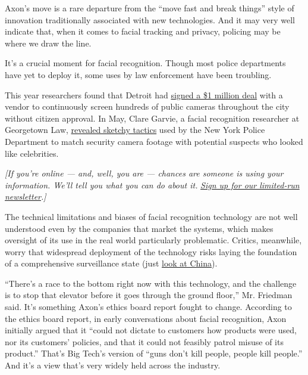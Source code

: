 Axon's move is a rare departure from the ``move fast and break things''
style of innovation traditionally associated with new technologies. And
it may very well indicate that, when it comes to facial tracking and
privacy, policing may be where we draw the line.

It's a crucial moment for facial recognition. Though most police
departments have yet to deploy it, some uses by law enforcement have
been troubling.

This year researchers found that Detroit had
\href{https://www.nytimes3xbfgragh.onion/2019/05/16/opinion/columnists/facial-recognition-ban-privacy.html?rref=collection\%2Fbyline\%2Ffarhad-manjoo\&action=click\&contentCollection=undefined\&region=stream\&module=stream_unit\&version=latest\&contentPlacement=5\&pgtype=collection}{signed
a \$1 million deal} with a vendor to continuously screen hundreds of
public cameras throughout the city without citizen approval. In May,
Clare Garvie, a facial recognition researcher at Georgetown Law,
\href{https://www.nytimes3xbfgragh.onion/2019/05/16/opinion/columnists/facial-recognition-ban-privacy.html?rref=collection\%2Fbyline\%2Ffarhad-manjoo\&action=click\&contentCollection=undefined\&region=stream\&module=stream_unit\&version=latest\&contentPlacement=5\&pgtype=collection}{revealed
sketchy tactics} used by the New York Police Department to match
security camera footage with potential suspects who looked like
celebrities.

\emph{{[}If you're online --- and, well, you are --- chances are someone
is using your information. We'll tell you what you can do about it.}
\href{https://www.nytimes3xbfgragh.onion/newsletters/privacy-project?action=click\&module=Intentional\&pgtype=Article}{\emph{Sign
up for our limited-run newsletter}}\emph{.{]}}

The technical limitations and biases of facial recognition technology
are not well understood even by the companies that market the systems,
which makes oversight of its use in the real world particularly
problematic. Critics, meanwhile, worry that widespread deployment of the
technology risks laying the foundation of a comprehensive surveillance
state (just
\href{https://www.nytimes3xbfgragh.onion/interactive/2019/04/04/world/asia/xinjiang-china-surveillance-prison.html?module=inline}{look
at China}).

``There's a race to the bottom right now with this technology, and the
challenge is to stop that elevator before it goes through the ground
floor,'' Mr. Friedman said. It's something Axon's ethics board report
fought to change. According to the ethics board report, in early
conversations about facial recognition, Axon initially argued that it
``could not dictate to customers how products were used, nor its
customers' policies, and that it could not feasibly patrol misuse of its
product.'' That's Big Tech's version of ``guns don't kill people, people
kill people.'' And it's a view that's very widely held across the
industry.

